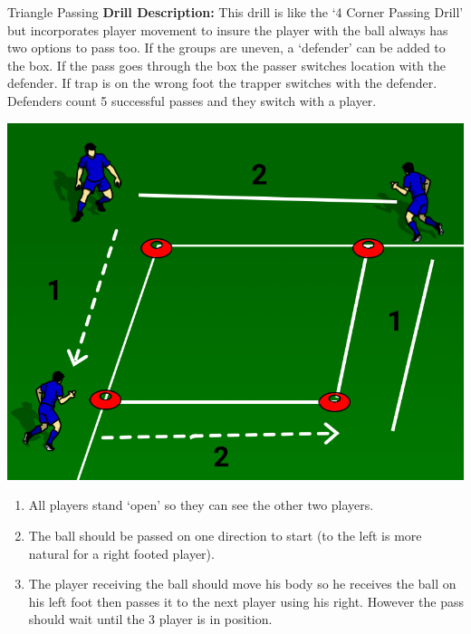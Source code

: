 \begin{evenBlock}{Triangle Passing}
\textbf{Drill Description:}
        This drill is like the `4 Corner Passing Drill' but incorporates player movement to insure the player with the ball always has two options to pass too.
        If the groups are uneven, a `defender' can be added to the box.  If the pass goes through the box the passer switches location with the defender.  If trap is on the wrong foot the trapper switches with the defender.  Defenders count 5 successful passes and they switch with a player.
\begin{minipage}[t]{\linewidth}
    \begin{minipage}{.3\linewidth} %
        \centering
        \includegraphics[width=\textwidth]{../img/Trimmed/Triangle_Passing_3P_mini}
    \end{minipage}
    \hspace{0.05\linewidth}
    \begin{minipage}{.6\linewidth} %
        \begin{enumerate}
            \setlength{\itemsep}{0pt}
            \setlength{\parskip}{0pt}
            \setlength{\parsep}{0pt}
            \item All players stand `open' so they can see the other two players.
            \item The ball should be passed on one direction to start (to the left is more natural for a right footed player).
            \item The player receiving the ball should move his body so he receives the ball on his left foot then passes it to the next player using his right.  However the pass should wait until the 3 player is in position.

\end{enumerate}
\end{minipage}
\end{minipage}
\end{evenBlock}

